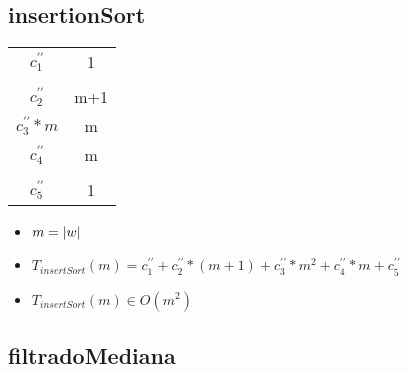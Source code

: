 \documentclass{article}
\begin{document}
    \subsection*{insertionSort}

    \begin{minipage}{0.70\textwidth}
        
    \end{minipage}
    \hfill
    \begin{minipage}{0.25\textwidth}
        \begin{tabular}{|c|c}

            $c^{\prime\prime}_1$ & 1 \\
            $                  $ &   \\
            $c^{\prime\prime}_2$ & m+1 \\
            $c^{\prime\prime}_3 * m$ & m \\
            $c^{\prime\prime}_4$ & m \\
            $                  $ &   \\
            $c^{\prime\prime}_5$ & 1 \\

        \end{tabular}
    \end{minipage}

    \begin{itemize}
        \item $m = |w|$
        \item $T_{insertSort}(m) = c^{\prime\prime}_1 + c^{\prime\prime}_2 * (m+1) + c^{\prime\prime}_3*m^2 + c^{\prime\prime}_4 * m + c^{\prime\prime}_5$
        \item $T_{insertSort}(m) \in O(m^{2})$
    \end{itemize}

    \subsection*{filtradoMediana}
\end{document}
